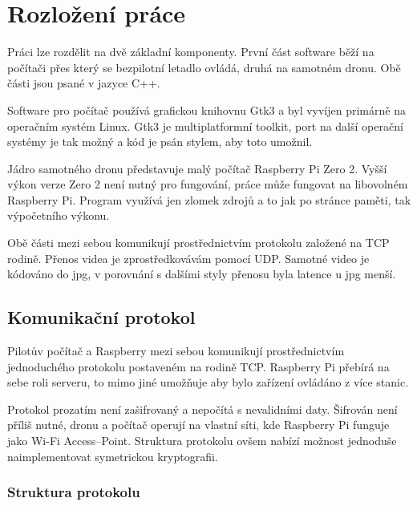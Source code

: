\documentclass[a4paper,oneside,12pt]{report}
\begin{document}


\tableofcontents


\newpage



\setcounter{page}{1}

\chapter{Rozložení práce}

Práci lze rozdělit na dvě základní komponenty.
První část software běží na počítači přes který se bezpilotní letadlo ovládá, druhá na samotném dronu.
Obě části jsou psané v jazyce C++.

Software pro počítač používá grafickou knihovnu Gtk3 a byl vyvíjen primárně na operačním systém Linux.
Gtk3 je multiplatformní toolkit, port na další operační systémy je tak možný a kód je psán stylem, aby toto umožnil.

Jádro samotného dronu představuje malý počítač Raspberry Pi Zero 2.
Vyšší výkon verze Zero 2 není nutný pro fungování, práce může fungovat na libovolném Raspberry Pi.
Program využívá jen zlomek zdrojů  a to jak po stránce paměti, tak výpočetního výkonu.

Obě části mezi sebou komunikují prostřednictvím protokolu založené na TCP rodině.
Přenos videa je zprostředkovávám pomocí UDP.
Samotné video je kódováno do jpg, v porovnání s dalšími styly přenosu byla latence u jpg menší.


\section{Komunikační protokol}

Pilotův počítač a Raspberry mezi sebou komunikují prostřednictvím jednoduchého protokolu postaveném na rodině TCP.
Raspberry Pi přebírá na sebe roli serveru, to mimo jiné umožňuje aby bylo zařízení ovládáno z více stanic.

Protokol prozatím není zašifrovaný a nepočítá s nevalidními daty.
Šifrován není příliš nutné, dronu a počítač operují na vlastní síti, kde Raspberry Pi funguje jako Wi-Fi Access--Point.
Struktura protokolu ovšem nabízí možnost jednoduše naimplementovat symetrickou kryptografii.

\subsection{Struktura protokolu}
\end{document}
